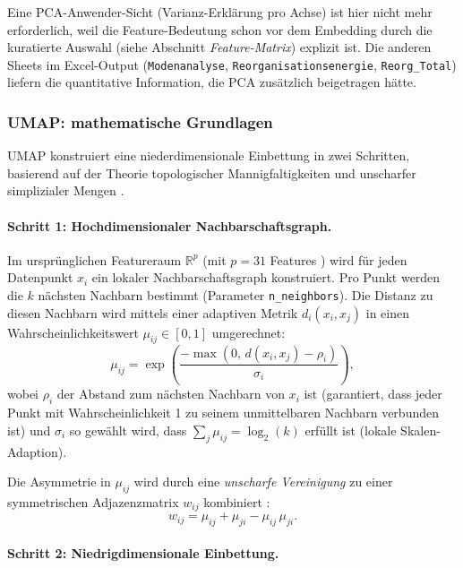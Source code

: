 \documentclass[11pt,a4paper,twoside]{article}
\theoremstyle{remark}
\begin{document}
Eine PCA-Anwender-Sicht (Varianz-Erkl\"arung pro Achse) ist hier nicht
mehr erforderlich, weil die Feature-Bedeutung schon vor dem Embedding
durch die kuratierte Auswahl (siehe Abschnitt \emph{Feature-Matrix})
explizit ist. Die anderen Sheets im Excel-Output
(\texttt{Modenanalyse}, \texttt{Reorganisationsenergie},
\texttt{Reorg\_Total}) liefern die quantitative Information, die PCA
zus\"atzlich beigetragen h\"atte.

\subsubsection*{UMAP: mathematische Grundlagen}

UMAP konstruiert eine niederdimensionale Einbettung in zwei Schritten,
basierend auf der Theorie topologischer Mannigfaltigkeiten und
unscharfer simplizialer Mengen \cite{McInnes2018}.

\paragraph{Schritt 1: Hochdimensionaler Nachbarschaftsgraph.}

Im urspr\"unglichen Featureraum $\mathbb{R}^p$ (mit $p = 31$ Features
) wird f\"ur jeden Datenpunkt $x_i$ ein lokaler
Nachbarschaftsgraph konstruiert. Pro Punkt werden die $k$ n\"achsten
Nachbarn bestimmt (Parameter \texttt{n\_neighbors}). Die Distanz zu
diesen Nachbarn wird mittels einer adaptiven Metrik
$d_i(x_i, x_j)$ in einen Wahrscheinlichkeitswert $\mu_{ij} \in [0,1]$
umgerechnet:
\begin{equation}
  \mu_{ij} = \exp\!\left(\frac{-\max(0,\,
              d(x_i, x_j) - \rho_i)}{\sigma_i}\right),
  \label{eq:umap-mu}
\end{equation}
wobei $\rho_i$ der Abstand zum n\"achsten Nachbarn von $x_i$ ist
(garantiert, dass jeder Punkt mit Wahrscheinlichkeit 1 zu seinem
unmittelbaren Nachbarn verbunden ist) und $\sigma_i$ so gew\"ahlt wird,
dass $\sum_j \mu_{ij} = \log_2(k)$ erf\"ullt ist (lokale
Skalen-Adaption).

Die Asymmetrie in $\mu_{ij}$ wird durch eine \emph{unscharfe Vereinigung}
zu einer symmetrischen Adjazenzmatrix $w_{ij}$ kombiniert
\cite{McInnes2018}:
\begin{equation}
  w_{ij} = \mu_{ij} + \mu_{ji} - \mu_{ij}\,\mu_{ji}.
  \label{eq:umap-w}
\end{equation}

\paragraph{Schritt 2: Niedrigdimensionale Einbettung.}
\end{document}
